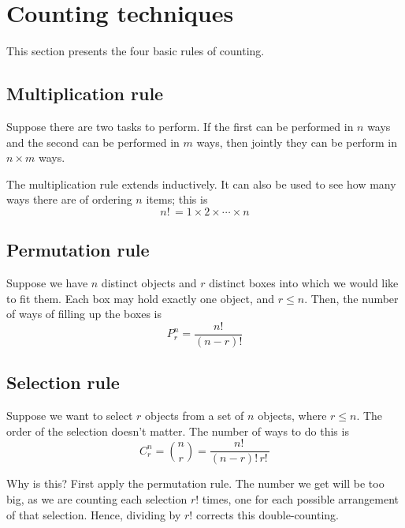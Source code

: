 \documentclass[11pt]{article}
\theoremstyle{definition}
\theoremstyle{remark}
\newcommand{\fact}{!\,}
\begin{document}
\section{Counting techniques}

This section presents the four basic rules of counting.

\subsection{Multiplication rule}
\label{sec:multiplication-rule}

Suppose there are two tasks to perform. If the first can be performed in $n$
ways and the second can be performed in $m$ ways, then jointly they can be
perform in $n \times m$ ways.

The multiplication rule extends inductively. It can also be used to see how
many ways there are of ordering $n$ items; this is
\begin{equation*}
    n\fact = 1 \times 2 \times \cdots \times n
\end{equation*}

\subsection{Permutation rule}
\label{sec:permutation-rule}

Suppose we have $n$ distinct objects and $r$ distinct boxes into which we would
like to fit them. Each box may hold exactly one object, and $r \leq n$. Then,
the number of ways of filling up the boxes is
\begin{equation}
    \label{eq:permutation-rule}
    P_r^n = \frac{n!}{(n-r)!}
\end{equation}

\subsection{Selection rule}
\label{sec:selection-rule}

Suppose we want to select $r$ objects from a set of $n$ objects, where
$r \leq n$. The order of the selection doesn't matter. The number of ways to do
this is
\begin{equation}
    \label{eq:selection-rule}
    C_r^n = {n \choose r} = \frac{n\fact}{(n-r)\fact r\fact}
\end{equation}

Why is this? First apply the permutation rule. The number we get will be too
big, as we are counting each selection $r!$ times, one for each possible
arrangement of that selection. Hence, dividing by $r!$ corrects this
double-counting.
\end{document}
